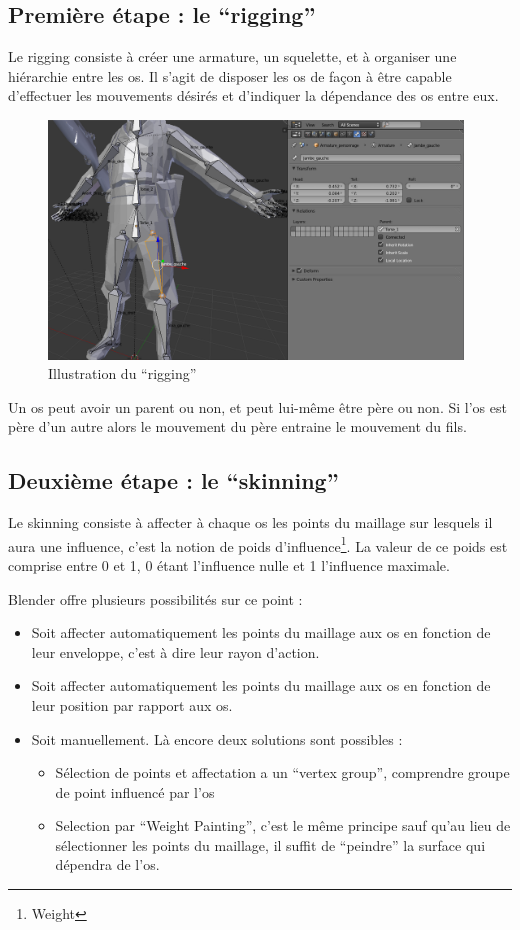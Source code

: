 \documentclass[11pt]{report}
\begin{document}
\subsection{Première étape : le ``rigging''}

Le rigging consiste à créer une armature, un squelette, et à organiser une hiérarchie entre les os.
Il s’agit de disposer les os de façon à être capable d’effectuer les mouvements désirés et d’indiquer la dépendance des os entre eux.

\begin{figure}[htbp]
\centering
\includegraphics[width=11cm]{rigging.png}
\caption{Illustration du ``rigging''}
\end{figure}

Un os peut avoir un parent ou non, et peut lui-même être père ou non. Si l’os est père d’un autre alors le mouvement du père entraine le mouvement du fils.

\subsection{Deuxième étape : le ``skinning''}

Le skinning consiste à affecter à chaque os les points du maillage sur lesquels il aura une influence, c’est la notion de poids d’influence\footnote{Weight}. La valeur de ce poids est comprise entre 0 et 1, 0 étant l’influence nulle et 1 l’influence maximale.

Blender offre plusieurs possibilités sur ce point :

\begin{itemize}
\item Soit affecter automatiquement les points du maillage aux os en  fonction de leur enveloppe, c’est à dire leur rayon d’action.
\item Soit affecter automatiquement les points du maillage aux os en  fonction de leur position par rapport aux os.
\item Soit manuellement. Là encore deux solutions sont possibles :
\begin{itemize}
	\item Sélection de points et affectation a un ``vertex group'', comprendre groupe de point influencé par l’os
	\item Selection par ``Weight Painting'', c’est le même principe sauf qu’au lieu de sélectionner les points du maillage, il suffit de ``peindre'' la surface qui dépendra de l’os.
\end{itemize}
\end{itemize}
\end{document}

